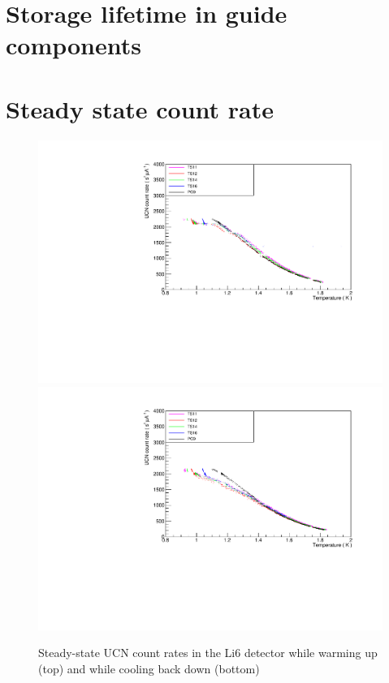 \documentclass[10pt,letterpaper]{article}
\begin{document}
\section{Storage lifetime in guide components}




\section{Steady state count rate}
\label{sec:steadystate}

\begin{figure}
\centering
\includegraphics[width=\textwidth,page=1]{../steady_state/li6RateVsTempRun1162.pdf}
\includegraphics[width=\textwidth,page=1]{../steady_state/li6RateVsTempRun1163.pdf}
\caption{Steady-state UCN count rates in the Li6 detector while warming up (top) and while cooling back down (bottom)}
\label{fig:steadystate}
\end{figure}
\end{document}

